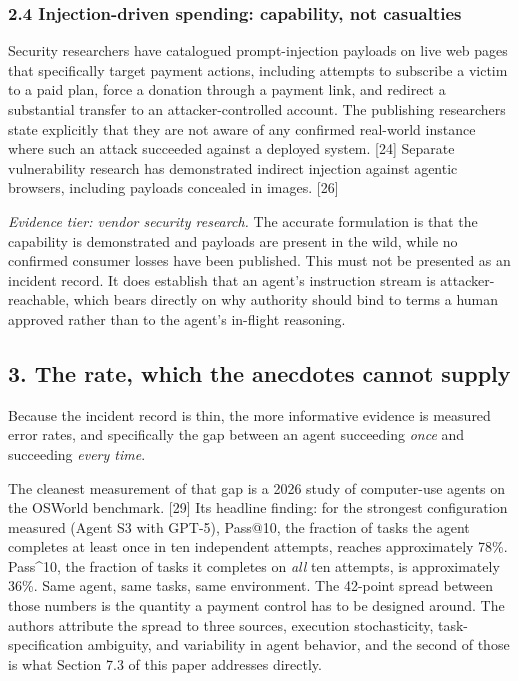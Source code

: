 \documentclass[
  11pt,
  letterpaper,
]{article}
\begin{document}
\subsubsection{2.4 Injection-driven spending: capability, not
casualties}\label{injection-driven-spending-capability-not-casualties}

Security researchers have catalogued prompt-injection payloads on live
web pages that specifically target payment actions, including attempts
to subscribe a victim to a paid plan, force a donation through a payment
link, and redirect a substantial transfer to an attacker-controlled
account. The publishing researchers state explicitly that they are not
aware of any confirmed real-world instance where such an attack
succeeded against a deployed system. {[}24{]} Separate vulnerability
research has demonstrated indirect injection against agentic browsers,
including payloads concealed in images. {[}26{]}

\emph{Evidence tier: vendor security research.} The accurate formulation
is that the capability is demonstrated and payloads are present in the
wild, while no confirmed consumer losses have been published. This must
not be presented as an incident record. It does establish that an
agent's instruction stream is attacker-reachable, which bears directly
on why authority should bind to terms a human approved rather than to
the agent's in-flight reasoning.

\subsection{3. The rate, which the anecdotes cannot
supply}\label{the-rate-which-the-anecdotes-cannot-supply}

Because the incident record is thin, the more informative evidence is
measured error rates, and specifically the gap between an agent
succeeding \emph{once} and succeeding \emph{every time}.

The cleanest measurement of that gap is a 2026 study of computer-use
agents on the OSWorld benchmark. {[}29{]} Its headline finding: for the
strongest configuration measured (Agent S3 with GPT-5), Pass@10, the
fraction of tasks the agent completes at least once in ten independent
attempts, reaches approximately 78\%. Pass\^{}10, the fraction of tasks
it completes on \emph{all} ten attempts, is approximately 36\%. Same
agent, same tasks, same environment. The 42-point spread between those
numbers is the quantity a payment control has to be designed around. The
authors attribute the spread to three sources, execution stochasticity,
task-specification ambiguity, and variability in agent behavior, and the
second of those is what Section 7.3 of this paper addresses directly.
\end{document}
